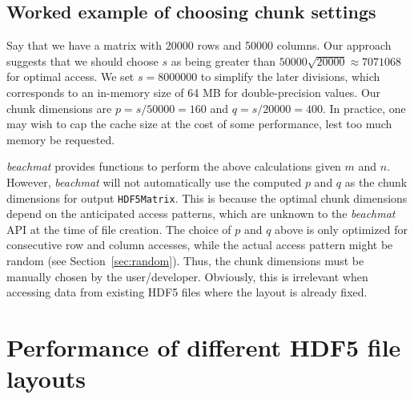\documentclass{article}
\begin{document}


%

\subsection{Worked example of choosing chunk settings}
Say that we have a matrix with 20000 rows and 50000 columns.
Our approach suggests that we should choose $s$ as being greater than $50000\sqrt{20000} \approx 7071068$ for optimal access.
We set $s=8000000$ to simplify the later divisions, which corresponds to an in-memory size of 64 MB for double-precision values.
Our chunk dimensions are $p = s/50000 = 160$ and $q = s/20000 = 400$.
In practice, one may wish to cap the cache size at the cost of some performance, lest too much memory be requested.

\textit{beachmat} provides functions to perform the above calculations given $m$ and $n$.
However, \textit{beachmat} will not automatically use the computed $p$ and $q$ as the chunk dimensions for output \texttt{HDF5Matrix}.
This is because the optimal chunk dimensions depend on the anticipated access patterns, which are unknown to the \textit{beachmat} API at the time of file creation.
The choice of $p$ and $q$ above is only optimized for consecutive row and column accesses, while the actual access pattern might be random (see Section~\ref{sec:random}).
Thus, the chunk dimensions must be manually chosen by the user/developer.
Obviously, this is irrelevant when accessing data from existing HDF5 files where the layout is already fixed.

\section{Performance of different HDF5 file layouts}
\end{document}

